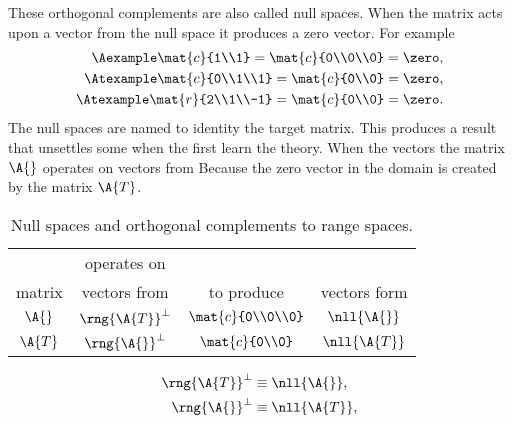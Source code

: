 These orthogonal complements are also called null spaces. When the matrix acts upon a vector from the null space it produces a zero vector. For example
\begin{equation}
  \begin{split}
     \Aexample  \mat{c}{1\\1}      = \mat{c}{0\\0\\0} = \zero,\\
     \Atexample \mat{c}{0\\1\\1}   = \mat{c}{0\\0}    = \zero,\\
     \Atexample \mat{r}{2\\1\\-1}  = \mat{c}{0\\0}    = \zero.
  \end{split}
\end{equation}
The null spaces are named to identity the target matrix. This produces a result that unsettles some when the first learn the theory. When the vectors the matrix $\A{}$ operates on vectors from Because the zero vector in the domain is created by the matrix $\A{T}$.
\begin{table}[htdp]
\begin{center}
\begin{tabular}{cccc}
         & operates on  &\\
  matrix & vectors from & to produce & vectors form\\\hline
  $\A{}$  & $\rng{\A{T}}^{\perp}$ & $\mat{c}{0\\0\\0}$ & $\nll{\A{}}$\\
  $\A{T}$ & $\rng{\A{}}^{\perp}$  & $\mat{c}{0\\0}$    & $\nll{\A{T}}$
\end{tabular}
\end{center}
\label{tab:02:null}
\caption[Null spaces and orthogonal complements to range spaces]{Null spaces and orthogonal complements to range spaces.}
\end{table}%

\begin{equation}
  \begin{split}
     \rng{\A{T}}^{\perp} &\equiv \nll{\A{}},\\
     \rng{\A{}}^{\perp}  &\equiv \nll{\A{T}},\\
  \end{split}
\end{equation}

